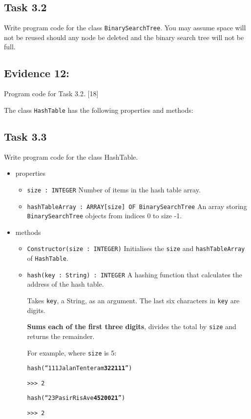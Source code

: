 \subsection*{Task 3.2 }

Write program code for the class \texttt{BinarySearchTree}. You may
assume space will not be reused should any node be deleted and the
binary search tree will not be full. 

\subsection*{Evidence 12: }

Program code for Task 3.2. \hfill{}{[}18{]}

The class \texttt{HashTable} has the following properties and methods:

\subsection*{Task 3.3}

Write program code for the class HashTable.
\begin{itemize}
\item properties
\begin{itemize}
\item \texttt{size : INTEGER} Number of items in the hash table array.
\item \texttt{hashTableArray : ARRAY{[}size{]} OF BinarySearchTree} An array
storing \texttt{BinarySearchTree} objects from indices 0 to size -1. 
\end{itemize}
\item methods
\begin{itemize}
\item \texttt{Constructor(size : INTEGER)} Initialises the \texttt{size}
and \texttt{hashTableArray} of \texttt{HashTable}. 
\item \texttt{hash(key : String) : INTEGER} A hashing function that calculates
the address of the hash table. 

Takes \texttt{key}, a String, as an argument. The last six characters
in \texttt{key} are digits.

\textbf{Sums each of the first three digits}, divides the total by
\texttt{size} and returns the remainder. 

For example, where \texttt{size} is 5: 

\noindent\begin{minipage}[t]{1\columnwidth}%
\texttt{hash(\textquotedblleft 111JalanTenteram}\texttt{\textbf{322111}}\texttt{\textquotedblright )}

\texttt{>\textcompwordmark >\textcompwordmark > 2 }

\texttt{hash(\textquotedblleft 23PasirRisAve}\texttt{\textbf{4520021}}\texttt{\textquotedblright )}

\texttt{>\textcompwordmark >\textcompwordmark > 2 }%
\end{minipage}
\end{itemize}
\end{itemize}

